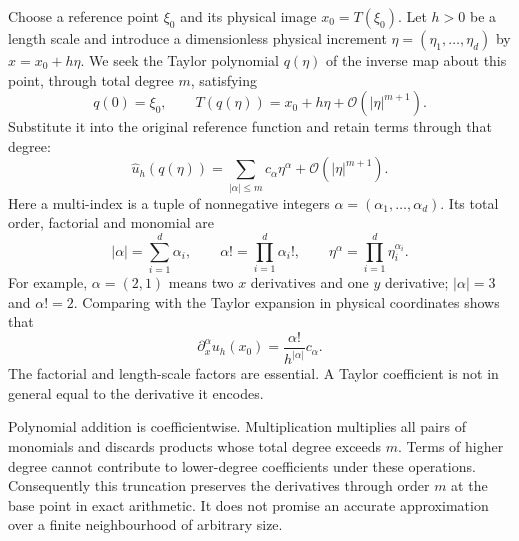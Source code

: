 Choose a reference point $\xi_0$ and its physical image $x_0=T(\xi_0)$.
Let $h>0$ be a length scale and introduce a dimensionless physical increment
$\eta=(\eta_1,\ldots,\eta_d)$ by $x=x_0+h\eta$. We seek the Taylor
polynomial $q(\eta)$ of the inverse map about this point, through total
degree $m$, satisfying
\begin{equation}
 q(0)=\xi_0,\qquad
 T(q(\eta))=x_0+h\eta+\mathcal O(|\eta|^{m+1}).
 \label{eq:app-inverse-series}
\end{equation}
Substitute it into the original reference function and retain terms through
that degree:
\begin{equation}
 \widehat u_h(q(\eta))
 =\sum_{|\alpha|\le m}c_\alpha\eta^\alpha
    +\mathcal O(|\eta|^{m+1}).
\end{equation}
Here a multi-index is a tuple of nonnegative integers
$\alpha=(\alpha_1,\ldots,\alpha_d)$. Its total order,
factorial and monomial are
\begin{equation}
 |\alpha|=\sum_{i=1}^d\alpha_i,\qquad
 \alpha!=\prod_{i=1}^d\alpha_i!,\qquad
 \eta^\alpha=\prod_{i=1}^d\eta_i^{\alpha_i}.
\end{equation}
For example, $\alpha=(2,1)$ means two $x$ derivatives and one $y$
derivative; $|\alpha|=3$ and $\alpha!=2$. Comparing with the Taylor
expansion in physical coordinates shows that
\begin{equation}
 \partial_x^\alpha u_h(x_0)=\frac{\alpha!}{h^{|\alpha|}}c_\alpha.
 \label{eq:app-jet-coefficient}
\end{equation}
The factorial and length-scale factors are essential. A Taylor coefficient
is not in general equal to the derivative it encodes.

Polynomial addition is coefficientwise. Multiplication multiplies all pairs
of monomials and discards products whose total degree exceeds $m$. Terms of
higher degree cannot contribute to lower-degree coefficients under these
operations. Consequently this truncation preserves the derivatives through
order $m$ at the base point in exact arithmetic. It does not promise an
accurate approximation over a finite neighbourhood of arbitrary size.

